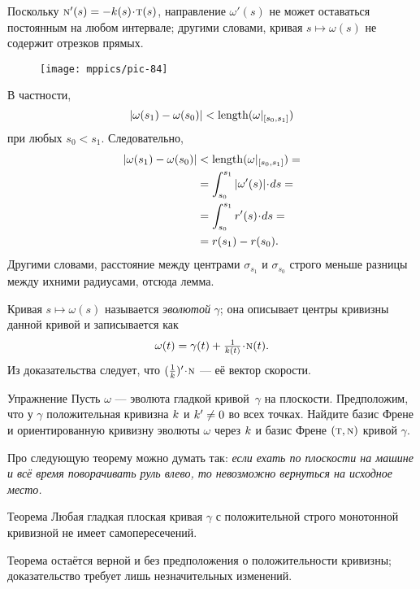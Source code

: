 Поскольку $\norm'(s)=-\skur(s)\cdot\tan(s)$, направление $\omega'(s)$ не может оставаться постоянным на любом интервале;
другими словами, кривая $s\mapsto \omega(s)$ не содержит отрезков прямых.

\begin{wrapfigure}[7]{o}{35 mm}
\vskip-0mm
\centering
\texttt{[image: mppics/pic-84]}
\end{wrapfigure}

В частности, 
\[|\omega(s_1)-\omega(s_0)|\z<\length(\omega|_{[s_0,s_1]})\]
при любых $s_0<s_1$.
Следовательно, 
\begin{align*}
|\omega(s_1)-\omega(s_0)|&<\length(\omega|_{[s_0,s_1]})=
\\
&=\int_{s_0}^{s_1}|\omega'(s)|\cdot ds=
\\
&=\int_{s_0}^{s_1}r'(s)\cdot ds=
\\
&=r(s_1)-r(s_0).
\end{align*}
Другими словами, расстояние между центрами $\sigma_{s_1}$ и $\sigma_{s_0}$
строго меньше разницы между ихними радиусами, отсюда лемма.
\qeds

Кривая $s\mapsto \omega(s)$ называется \emph{эволютой} $\gamma$;
она описывает центры кривизны данной кривой и записывается как
\[\omega(t)=\gamma(t)+\tfrac1{\skur(t)}\cdot \norm(t).\]
Из доказательства следует, что $(\tfrac1{\skur})'\cdot\norm$ --- её вектор скорости.

\begin{thm}{Упражнение}\label{ex:evolute}
Пусть $\omega$ --- эволюта гладкой кривой~$\gamma$ на плоскости.
Предположим, что у $\gamma$ положительная кривизна $k$ и $k ^{\prime} \neq 0$ во всех точках.
Найдите базис Френе и ориентированную кривизну эволюты $\omega$ через $k$ и базис Френе $(\text{\sc{t}},\text{\sc{n}})$ кривой $\gamma$.
\end{thm}

Про следующую теорему можно думать так:
\textit{если ехать по плоскости на машине и всё время поворачивать руль влево,
то невозможно вернуться на исходное место.}

\begin{thm}{Теорема}\label{thm:spiral}
Любая гладкая плоская кривая $\gamma$ с положительной строго монотонной кривизной не имеет самопересечений.
\end{thm}

Теорема остаётся верной и без предположения о положительности кривизны; доказательство требует лишь незначительных изменений.

